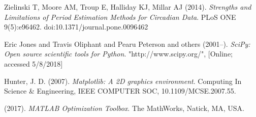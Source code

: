 \documentclass[conference]{IEEEtran}
\begin{document}


%
%
%
\begin{thebibliography}{3}
Zielinski T, Moore AM, Troup E, Halliday KJ, Millar AJ (2014). \emph{Strengths and Limitations of Period Estimation Methods for Circadian Data}. PLoS ONE 9(5):e96462. doi:10.1371/journal.pone.0096462

Eric Jones and Travis Oliphant and Pearu Peterson and others (2001--). \emph{{SciPy}: Open source scientific tools for {Python}}. "http://www.scipy.org/", {[Online; accessed 5/8/2018]}

Hunter, J. D. (2007). \emph{Matplotlib: A 2D graphics environment}. Computing In Science \& Engineering, IEEE COMPUTER SOC, 10.1109/MCSE.2007.55.

(2017). \emph{MATLAB Optimization Toolbox}. The MathWorks, Natick, MA, USA.

\end{thebibliography}
\end{document}
